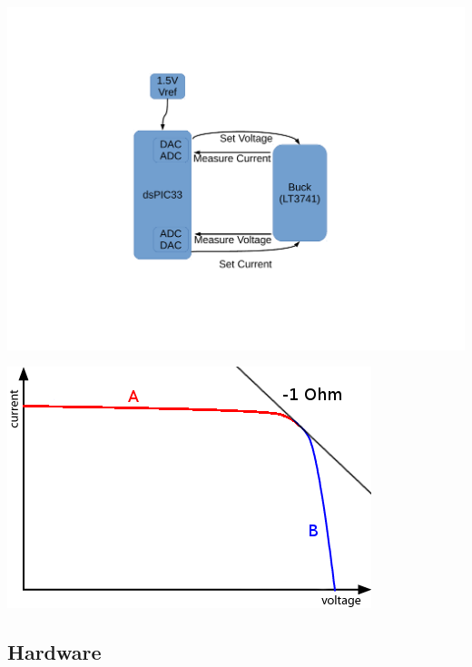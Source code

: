 \begin{minipage}{0.5\textwidth}
    \center
    \includegraphics[width=\textwidth,trim=140 140 120 100,clip]{images/block-diag-control.pdf}
    \label{fig:controlcircuit:schcematic}
\end{minipage}
\begin{minipage}{0.5\textwidth}
    \center
    \includegraphics[width=\textwidth]{images/vi-curve.png}
    \label{fig:controlcircuit:vicurve}
\end{minipage}


\subsection{Hardware}

